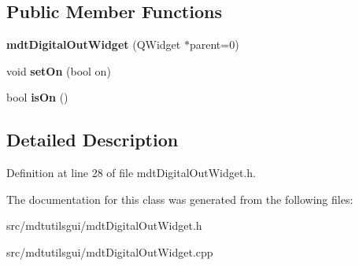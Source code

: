 \subsection*{Public Member Functions}
\begin{DoxyCompactItemize}
\item 
\hypertarget{classmdt_digital_out_widget_a71a1e8b0eb39b51bce4d3df49293fb89}{
{\bfseries mdtDigitalOutWidget} (QWidget $\ast$parent=0)}
\label{classmdt_digital_out_widget_a71a1e8b0eb39b51bce4d3df49293fb89}

\item 
\hypertarget{classmdt_digital_out_widget_a36f8c64f5ab3068351de1ca876cfadf5}{
void {\bfseries setOn} (bool on)}
\label{classmdt_digital_out_widget_a36f8c64f5ab3068351de1ca876cfadf5}

\item 
\hypertarget{classmdt_digital_out_widget_a406ac62b41321b3e6c1214deb0c95621}{
bool {\bfseries isOn} ()}
\label{classmdt_digital_out_widget_a406ac62b41321b3e6c1214deb0c95621}

\end{DoxyCompactItemize}


\subsection{Detailed Description}


Definition at line 28 of file mdtDigitalOutWidget.h.



The documentation for this class was generated from the following files:\begin{DoxyCompactItemize}
\item 
src/mdtutilsgui/mdtDigitalOutWidget.h\item 
src/mdtutilsgui/mdtDigitalOutWidget.cpp\end{DoxyCompactItemize}
